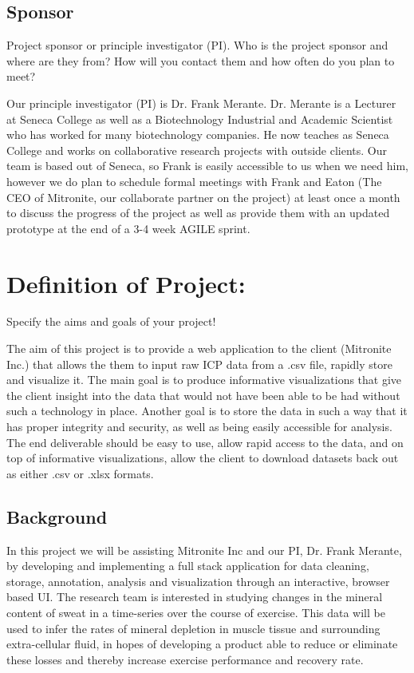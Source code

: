 \documentclass[10pt,twocolumn,letterpaper]{article}
\begin{document}
            	\subsection{Sponsor}

            	Project sponsor or principle investigator (PI).
		Who is the project sponsor and where are they from?
		How will you contact them and how often do you plan to meet?

		Our principle investigator (PI) is Dr. Frank Merante.
		Dr. Merante is a Lecturer at Seneca College as well as a Biotechnology Industrial and Academic Scientist who has worked for many biotechnology companies.
		He now teaches as Seneca College and works on collaborative research projects with outside clients.
		Our team is based out of Seneca, so Frank is easily accessible to us when we need him, however we do plan to schedule formal meetings with Frank and Eaton (The CEO of
		Mitronite, our collaborate partner on the project) at least once a month to discuss the progress of the project as well as provide them with an updated prototype at the
		end of a 3-4 week AGILE sprint.
		
		\section{Definition of Project:}

        Specify the aims and goals of your project!
		
		The aim of this project is to provide a web application to the client (Mitronite Inc.) that allows the them to input raw ICP data from a .csv file, rapidly store and
		visualize it.
		The main goal is to produce informative visualizations that give the client insight into the data that would not have been able to be had without such a technology in
		place.
		Another goal is to store the data in such a way that it has proper integrity and security, as well as being easily accessible for analysis.
		The end deliverable should be easy to use, allow rapid access to the data, and on top of informative visualizations, allow the client to download datasets back out as
		either .csv or .xlsx formats.
		
            \subsection{Background}

            In this project we will be assisting Mitronite Inc and our PI, Dr. Frank Merante, by developing and implementing a full stack application for data cleaning, storage,
	    annotation, analysis and visualization through an interactive, browser based UI.
	    The research team is interested in studying changes in the mineral content of sweat in a time-series over the course of exercise. This data will be used to infer the
	    rates of mineral depletion in muscle tissue and surrounding extra-cellular fluid, in hopes of developing a product able to reduce or eliminate these losses and
	    thereby increase exercise performance and recovery rate.
\end{document}
